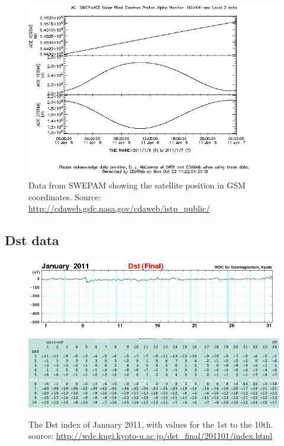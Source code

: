 \documentclass[norsk,a4paper,11pt]{article}
\begin{document}
\begin{multicols}{2}
\begin{figure}[H]
	\includegraphics[scale=0.4]{Figures/ACE_positionGSM.png}
	\centering
	\caption{Data from SWEPAM showing the satellite position in GSM coordinates. Source: \url{http://cdaweb.gsfc.nasa.gov/cdaweb/istp_public/}}
	\label{fig:ACE_pos}
\end{figure}



\subsection{Dst data} %
\label{sub:dst_data}

\begin{figure}[H]
	\includegraphics[scale=0.3]{Figures/dst1101.png}
	\includegraphics[scale=0.3]{Figures/dst_january.png}
	\centering
	\caption{The Dst index of January 2011, with values for the 1st to the 10th. source: \url{http://wdc.kugi.kyoto-u.ac.jp/dst_final/201101/index.html}}
	\label{fig:Dst}
\end{figure}


\end{multicols}
\end{document}
